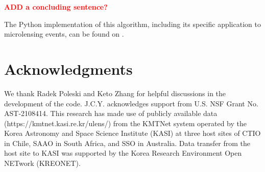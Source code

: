 \documentclass[preprint]{aastex631}
\newcommand{\HL}[1]{\textcolor{red}{\bf#1}}
\begin{document}
\HL{ADD a concluding sentence?}

\vspace{12pt}
The Python implementation of this algorithm, including its specific application to microlensing events, can be found on .

\section*{Acknowledgments}

We thank Radek Poleski and Keto Zhang for helpful discussions in the development of the code.
J.C.Y. acknowledges support from U.S. NSF Grant No. AST-2108414. 
This research has made use of publicly available data 
(https://kmtnet.kasi.re.kr/ulens/) from the KMTNet system
operated by the Korea Astronomy and Space Science Institute
(KASI) at three host sites of CTIO in Chile, SAAO in South
Africa, and SSO in Australia. Data transfer from the host site to
KASI was supported by the Korea Research Environment
Open NETwork (KREONET).




\FloatBarrier
\newpage
\end{document}
